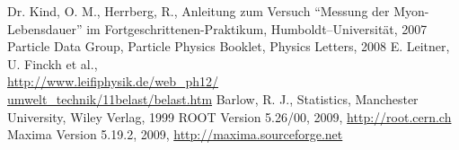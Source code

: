 \renewcommand{\refname}{Literatur und Programme}
\begin{thebibliography}{xxxxxx}
Dr. Kind, O. M., Herrberg, R., Anleitung zum Versuch ``Messung der
Myon-Lebensdauer'' im
Fortgeschrittenen-Praktikum, Humboldt–Universität, 2007
Particle Data Group, Particle Physics Booklet, Physics Letters, 2008
E. Leitner, U. Finckh et al.,\\
\href{http://www.leifiphysik.de/web_ph12/umwelt_technik/11belast/belast.htm}{
http://www.leifiphysik.de/web\_ph12/\\umwelt\_technik/11belast/belast.htm}
Barlow, R. J., Statistics, Manchester University, Wiley Verlag, 1999
ROOT Version 5.26/00, 2009, \href{http://root.cern.ch}{http://root.cern.ch}
Maxima Version 5.19.2, 2009, \href{http://maxima.sourceforge.net}{http://maxima.sourceforge.net}
\end{thebibliography}